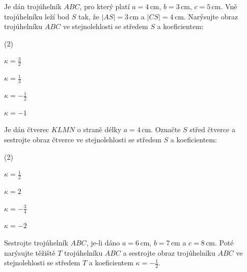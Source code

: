 \documentclass[12pt,a4paper]{article}
\begin{document}
\begin{exercise}

    Je dán trojúhelník $ABC$, pro který platí $a=4\,\mathrm{cm}$, $b=3\,\mathrm{cm}$, $c=5\,\mathrm{cm}$.
    Vně trojúhelníku leží bod $S$ tak, že $|AS|=3\,\mathrm{cm}$ a $|CS|=4\,\mathrm{cm}$.
    Narýsujte obraz trojúhelníku $ABC$ ve stejnolehlosti se středem $S$ a koeficientem:

    \begin{tasks}(2)

        \task $\kappa=\tfrac32$

        \task $\kappa=\tfrac13$

        \task $\kappa=-\tfrac12$

        \task $\kappa=-1$

    \end{tasks}

\end{exercise}



\begin{exercise}

    Je dán čtverec $KLMN$ o straně délky $a=4\,\mathrm{cm}$.
    Označte $S$ střed čtverce a sestrojte obraz čtverce ve stejnolehlosti se středem $S$ a koeficientem:

    \begin{tasks}(2)

        \task $\kappa=\tfrac12$

        \task $\kappa=2$

        \task $\kappa=-\tfrac34$

        \task $\kappa=-2$

    \end{tasks}

\end{exercise}



\begin{exercise}

    Sestrojte trojúhelník $ABC$, je-li dáno $a=6\,\mathrm{cm}$, $b=7\,\mathrm{cm}$ a $c=8\,\mathrm{cm}$.
    Poté narýsujte těžiště $T$ trojúhelníku $ABC$ a sestrojte obraz trojúhelníku $ABC$ ve stejnolehlosti
    se středem $T$ a koeficientem $\kappa=-\tfrac12$.

\end{exercise}
\end{document}
